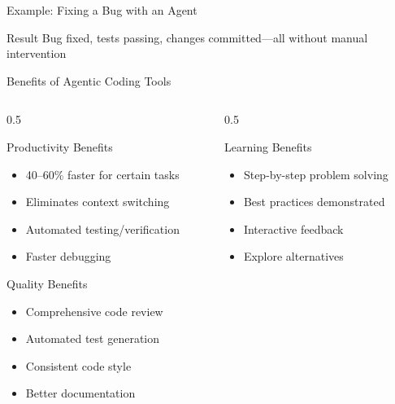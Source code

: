 \documentclass[aspectratio=169,11pt]{beamer}
\begin{document}
\begin{frame}{Example: Fixing a Bug with an Agent}
    \vspace{0.2cm}
    \begin{exampleblock}{Result}
        Bug fixed, tests passing, changes committed---all without manual intervention
    \end{exampleblock}

\end{frame}

\begin{frame}{Benefits of Agentic Coding Tools}
    \begin{columns}[T]
        \begin{column}{0.5\textwidth}
            \begin{block}{Productivity Benefits}
                \begin{itemize}
                    \item 40--60\% faster for certain tasks
                    \item Eliminates context switching
                    \item Automated testing/verification
                    \item Faster debugging
                \end{itemize}
            \end{block}

            \begin{block}{Quality Benefits}
                \begin{itemize}
                    \item Comprehensive code review
                    \item Automated test generation
                    \item Consistent code style
                    \item Better documentation
                \end{itemize}
            \end{block}
        \end{column}
        \begin{column}{0.5\textwidth}
            \begin{block}{Learning Benefits}
                \begin{itemize}
                    \item Step-by-step problem solving
                    \item Best practices demonstrated
                    \item Interactive feedback
                    \item Explore alternatives
                \end{itemize}
            \end{block}


\end{column}
\end{columns}
\end{frame}
\end{document}
